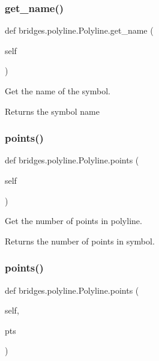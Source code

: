 \subsubsection{\texorpdfstring{get\+\_\+name()}{get\_name()}}
{\footnotesize\ttfamily def bridges.\+polyline.\+Polyline.\+get\+\_\+name (\begin{DoxyParamCaption}\item[{}]{self }\end{DoxyParamCaption})}



Get the name of the symbol. 

\begin{DoxyReturn}{Returns}
the symbol name 
\end{DoxyReturn}
\mbox{\label{classbridges_1_1polyline_1_1_polyline_ad1671a5857ad9e4010b7783b472c83fa}} 
\subsubsection{\texorpdfstring{points()}{points()}\hspace{0.1cm}{\footnotesize\ttfamily [1/2]}}
{\footnotesize\ttfamily def bridges.\+polyline.\+Polyline.\+points (\begin{DoxyParamCaption}\item[{}]{self }\end{DoxyParamCaption})}



Get the number of points in polyline. 

\begin{DoxyReturn}{Returns}
the number of points in symbol. 
\end{DoxyReturn}
\mbox{\label{classbridges_1_1polyline_1_1_polyline_ad543fcb38cb561b71d2ae2a9a88d9888}} 
\subsubsection{\texorpdfstring{points()}{points()}\hspace{0.1cm}{\footnotesize\ttfamily [2/2]}}
{\footnotesize\ttfamily def bridges.\+polyline.\+Polyline.\+points (\begin{DoxyParamCaption}\item[{}]{self,  }\item[{}]{pts }\end{DoxyParamCaption})}



